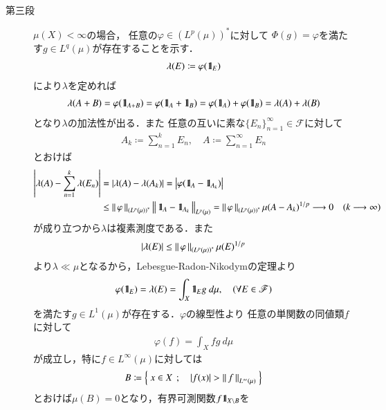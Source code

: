 \begin{prf}
\begin{description}
			\item[第三段]
				$\mu(X) < \infty$の場合，
				任意の$\varphi \in \left( L^p(\mu) \right)^*$に対して
				$\Phi(g) = \varphi$を満たす$g \in L^q(\mu)$が存在することを示す．
				\begin{align}
					\lambda(E) \coloneqq \varphi(\mbox{1}\hspace{-0.25em}\mbox{l}_E)
				\end{align}
				により$\lambda$を定めれば
				\begin{align}
					\lambda(A + B) = \varphi(\mbox{1}\hspace{-0.25em}\mbox{l}_{A+B}) = \varphi(\mbox{1}\hspace{-0.25em}\mbox{l}_A + \mbox{1}\hspace{-0.25em}\mbox{l}_B)
					= \varphi(\mbox{1}\hspace{-0.25em}\mbox{l}_A) + \varphi(\mbox{1}\hspace{-0.25em}\mbox{l}_B)
					= \lambda(A) + \lambda(B)
				\end{align}
				となり$\lambda$の加法性が出る．また
				任意の互いに素な$\{E_n\}_{n=1}^\infty \in \mathscr{F}$に対して
				\begin{align}
					A_k \coloneqq \sum_{n=1}^k E_n,
					\quad A \coloneqq \sum_{n=1}^\infty E_n
				\end{align}
				とおけば
				\begin{align}
					\left| \lambda(A) - \sum_{n=1}^k \lambda(E_n) \right|
					&= \left| \lambda(A) - \lambda(A_k) \right|
					= \left| \varphi(\mbox{1}\hspace{-0.25em}\mbox{l}_A - \mbox{1}\hspace{-0.25em}\mbox{l}_{A_k}) \right| \\
					&\leq \left\|\, \varphi\, \right\|_{\left( L^p(\mu) \right)^*} \left\|\, \mbox{1}\hspace{-0.25em}\mbox{l}_A - \mbox{1}\hspace{-0.25em}\mbox{l}_{A_k}\, \right\|_{L^p(\mu)}
					= \left\|\, \varphi\, \right\|_{\left( L^p(\mu) \right)^*} \mu(A - A_k)^{1/p}
					\longrightarrow 0
					\quad (k \longrightarrow \infty)
				\end{align}
				が成り立つから$\lambda$は複素測度である．また
				\begin{align}
					|\lambda(E)| \leq \left\|\, \varphi\, \right\|_{\left( L^p(\mu) \right)^*} \mu(E)^{1/p}
				\end{align}
				より$\lambda \ll \mu$となるから，Lebesgue-Radon-Nikodymの定理より
				\begin{align}
					\varphi(\mbox{1}\hspace{-0.25em}\mbox{l}_E) = \lambda(E) = \int_X \mbox{1}\hspace{-0.25em}\mbox{l}_E g\ d\mu,
					\quad (\forall E \in \mathscr{F})
				\end{align}
				を満たす$g \in L^1(\mu)$が存在する．$\varphi$の線型性より
				任意の単関数の同値類$f$に対して
				\begin{align}
					\varphi(f) = \int_X fg\ d\mu
					\label{eq:thm_dual_space_of_L_p_2}
				\end{align}
				が成立し，特に$f \in L^\infty(\mu)$に対しては
				\begin{align}
					B \coloneqq \left\{\ x \in X\ \, ; \quad |f(x)| > \left\|\, f\, \right\|_{L^\infty(\mu)}\ \right\}
				\end{align}
				とおけば$\mu(B) = 0$となり，有界可測関数$f \mbox{1}\hspace{-0.25em}\mbox{l}_{X \backslash B}$を

\end{description}
\end{prf}
